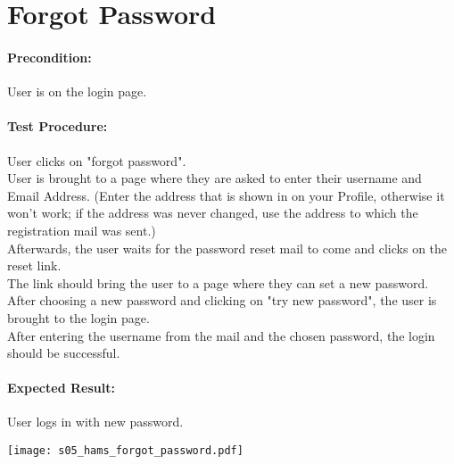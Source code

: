 \documentclass{scrreprt}
\begin{document}
\begin{minipage}[c]{0.4\textwidth}

\section{Forgot Password}

\paragraph{Precondition:}
User is on the login page.\\

\paragraph{Test Procedure:}
User clicks on "forgot password".\\
User is brought to a page where they are asked to enter their username and Email Address. (Enter the address that is shown in on your Profile, otherwise it won't work; if the address was never changed, use the address to which the registration mail was sent.) \\
Afterwards, the user waits for the password reset mail to come and clicks on the reset link.\\
The link should bring the user to a page where they can set a new password.\\
After choosing a new password and clicking on "try new password", the user is brought to the login page.\\
After entering the username from the mail and the chosen password, the
login should be successful.\\

\paragraph{Expected Result:}
User logs in with new password.

\end{minipage}
\hfill
\begin{minipage}[c]{0.5\textwidth}
	\texttt{[image: s05\_hams\_forgot\_password.pdf]}
\end{minipage}
\end{document}
